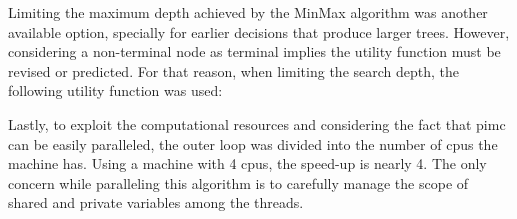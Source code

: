 Limiting the maximum depth achieved by the MinMax algorithm was another available option, specially for earlier decisions that produce larger trees.
However, considering a non-terminal node as terminal implies the utility function must be revised or predicted.
For that reason, when limiting the search depth, the following utility function was used:

Lastly, to exploit the computational resources and considering the fact that \ac{pimc} can be easily paralleled, the outer loop was divided into the number of \acp{cpu} the machine has.
Using a machine with 4 \acp{cpu}, the speed-up is nearly 4.
The only concern while paralleling this algorithm is to carefully manage the scope of shared and private variables among the threads.
















